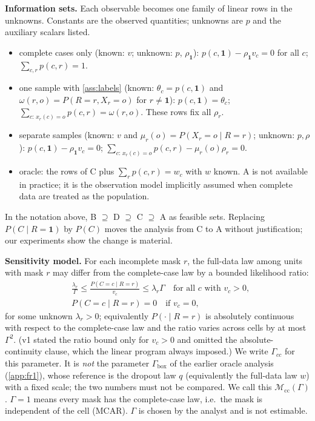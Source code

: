 \documentclass{article}
\theoremstyle{plain}
\theoremstyle{definition}
\theoremstyle{remark}
\newcommand{\one}{\mathbf{1}}
\newcommand{\Mcc}{\mathcal{M}_{\mathrm{cc}}}
\begin{document}
\textbf{Information sets.} Each observable becomes one family of linear rows
in the unknowns. Constants are the observed quantities; unknowns are $p$ and
the auxiliary scalars listed.
\begin{itemize}
\item[\textbf{B}] complete cases only (known: $v$; unknown: $p$, $\rho_{\one}$):
$p(c,\one)-\rho_{\one}v_c=0$ for all $c$; $\sum_{c,r}p(c,r)=1$.
\item[\textbf{C}] one sample with \cref{ass:labels} (known: $\theta_c=p(c,\one)$
and $\omega(r,o)=P(R=r,X_r=o)$ for $r\neq\one$):
$p(c,\one)=\theta_c$; $\sum_{c:\,x_r(c)=o}p(c,r)=\omega(r,o)$. These rows fix
all $\rho_r$.
\item[\textbf{D}] separate samples (known: $v$ and
$\mu_r(o)=P(X_r=o\mid R=r)$; unknown: $p,\rho$):
$p(c,\one)-\rho_{\one}v_c=0$; $\sum_{c:\,x_r(c)=o}p(c,r)-\mu_r(o)\rho_r=0$.
\item[\textbf{A}] oracle: the rows of C plus $\sum_r p(c,r)=w_c$ with $w$
known. A is not available in practice; it is the observation model implicitly
assumed when complete data are treated as the population.
\end{itemize}
In the notation above, B $\supseteq$ D $\supseteq$ C $\supseteq$ A as feasible
sets. Replacing $P(C\mid R=\one)$ by $P(C)$ moves the analysis from C to A
without justification; our experiments show the change is material.

\textbf{Sensitivity model.} For each incomplete mask $r$, the full-data law
among units with mask $r$ may differ from the complete-case law by a bounded
likelihood ratio:
\begin{equation}\label{eq:mcc}
\begin{aligned}
&\frac{\lambda_r}{\Gamma}\le\frac{P(C=c\mid R=r)}{v_c}\le\lambda_r\Gamma
\quad\text{for all }c\text{ with }v_c>0,\\
&P(C=c\mid R=r)=0\quad\text{if }v_c=0,
\end{aligned}
\end{equation}
for some unknown $\lambda_r>0$; equivalently $P(\cdot\mid R=r)$ is absolutely
continuous with respect to the complete-case law and the ratio varies across
cells by at most $\Gamma^2$. (v1 stated the ratio bound only for $v_c>0$ and
omitted the absolute-continuity clause, which the linear program always
imposed.) We write $\Gamma_{cc}$ for this parameter. It is \emph{not} the
parameter $\Gamma_{\mathrm{box}}$ of the earlier oracle analysis
(\cref{app:fr1}), whose reference is the dropout law $q$ (equivalently the
full-data law $w$) with a fixed scale; the two numbers must not be compared. We call this $\Mcc(\Gamma)$. $\Gamma=1$ means every mask
has the complete-case law, i.e.\ the mask is independent of the cell (MCAR).
$\Gamma$ is chosen by the analyst and is not estimable.
\end{document}
